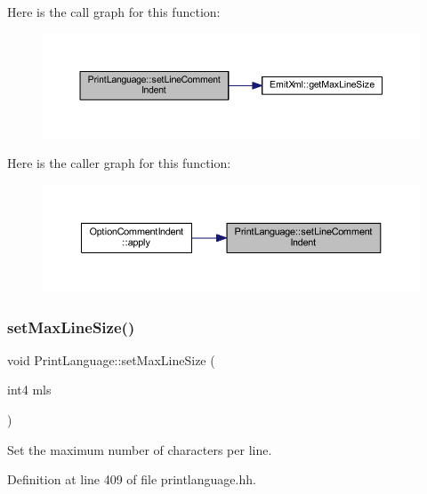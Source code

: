 Here is the call graph for this function\+:
\nopagebreak
\begin{figure}[H]
\begin{center}
\leavevmode
\includegraphics[width=350pt]{class_print_language_a3fff2b3ce27f87722011688cd3ba19d6_cgraph}
\end{center}
\end{figure}
Here is the caller graph for this function\+:
\nopagebreak
\begin{figure}[H]
\begin{center}
\leavevmode
\includegraphics[width=350pt]{class_print_language_a3fff2b3ce27f87722011688cd3ba19d6_icgraph}
\end{center}
\end{figure}
\mbox{\label{class_print_language_a15e8b97bbcbc19b0235339cafeb39d79}} 
\subsubsection{\texorpdfstring{setMaxLineSize()}{setMaxLineSize()}}
{\footnotesize\ttfamily void Print\+Language\+::set\+Max\+Line\+Size (\begin{DoxyParamCaption}\item[{int4}]{mls }\end{DoxyParamCaption})\hspace{0.3cm}{\ttfamily [inline]}}



Set the maximum number of characters per line. 



Definition at line 409 of file printlanguage.\+hh.

